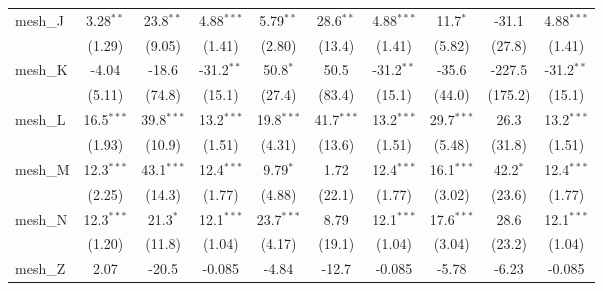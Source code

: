\begin{tabular}{lccccccccc}
   mesh\_J                                                     & 3.28$^{**}$   & 23.8$^{**}$   & 4.88$^{***}$  & 5.79$^{**}$   & 28.6$^{**}$    & 4.88$^{***}$  & 11.7$^{*}$    & -31.1          & 4.88$^{***}$\\   
                                                               & (1.29)        & (9.05)        & (1.41)        & (2.80)        & (13.4)         & (1.41)        & (5.82)        & (27.8)         & (1.41)\\   
   mesh\_K                                                     & -4.04         & -18.6         & -31.2$^{**}$  & 50.8$^{*}$    & 50.5           & -31.2$^{**}$  & -35.6         & -227.5         & -31.2$^{**}$\\   
                                                               & (5.11)        & (74.8)        & (15.1)        & (27.4)        & (83.4)         & (15.1)        & (44.0)        & (175.2)        & (15.1)\\   
   mesh\_L                                                     & 16.5$^{***}$  & 39.8$^{***}$  & 13.2$^{***}$  & 19.8$^{***}$  & 41.7$^{***}$   & 13.2$^{***}$  & 29.7$^{***}$  & 26.3           & 13.2$^{***}$\\   
                                                               & (1.93)        & (10.9)        & (1.51)        & (4.31)        & (13.6)         & (1.51)        & (5.48)        & (31.8)         & (1.51)\\   
   mesh\_M                                                     & 12.3$^{***}$  & 43.1$^{***}$  & 12.4$^{***}$  & 9.79$^{*}$    & 1.72           & 12.4$^{***}$  & 16.1$^{***}$  & 42.2$^{*}$     & 12.4$^{***}$\\   
                                                               & (2.25)        & (14.3)        & (1.77)        & (4.88)        & (22.1)         & (1.77)        & (3.02)        & (23.6)         & (1.77)\\   
   mesh\_N                                                     & 12.3$^{***}$  & 21.3$^{*}$    & 12.1$^{***}$  & 23.7$^{***}$  & 8.79           & 12.1$^{***}$  & 17.6$^{***}$  & 28.6           & 12.1$^{***}$\\   
                                                               & (1.20)        & (11.8)        & (1.04)        & (4.17)        & (19.1)         & (1.04)        & (3.04)        & (23.2)         & (1.04)\\   
   mesh\_Z                                                     & 2.07          & -20.5         & -0.085        & -4.84         & -12.7          & -0.085        & -5.78         & -6.23          & -0.085\\   

\end{tabular}
